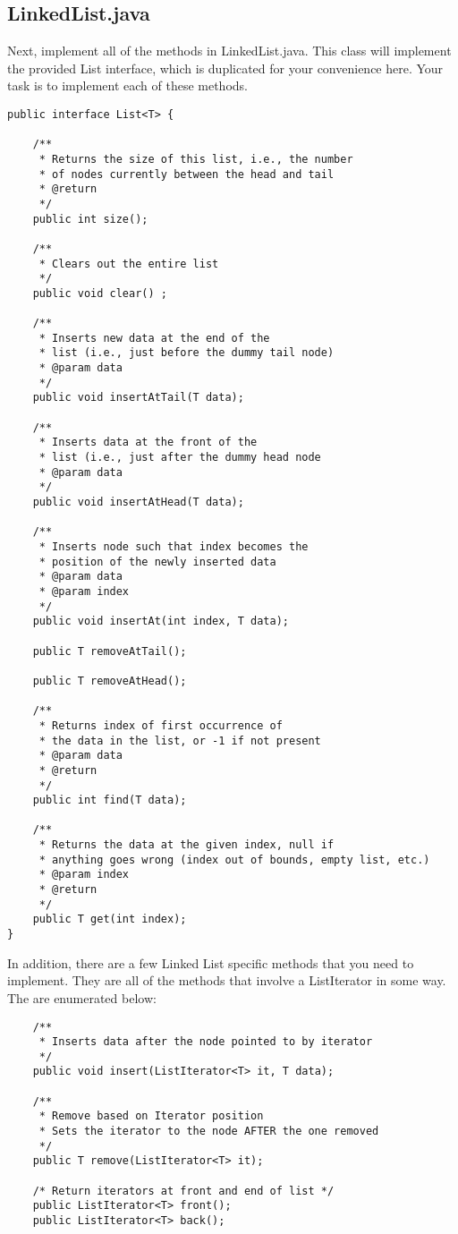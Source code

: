 \documentclass[paper=a4, fontsize=11pt, parskip=full]{scrartcl} %
\numberwithin{equation}{section} %
\numberwithin{figure}{section} %
\numberwithin{table}{section} %
\begin{document}
\subsection{LinkedList.java}

Next, implement all of the methods in LinkedList.java. This class will implement the provided List interface, which is duplicated for your convenience here. Your task is to implement each of these methods.

\begin{lstlisting}
public interface List<T> {

	/**
	 * Returns the size of this list, i.e., the number
	 * of nodes currently between the head and tail
	 * @return
	 */
	public int size();

	/**
	 * Clears out the entire list
	 */
	public void clear() ;

	/**
	 * Inserts new data at the end of the
	 * list (i.e., just before the dummy tail node)
	 * @param data
	 */
	public void insertAtTail(T data);

	/**
	 * Inserts data at the front of the
	 * list (i.e., just after the dummy head node
	 * @param data
	 */
	public void insertAtHead(T data);

	/**
	 * Inserts node such that index becomes the
	 * position of the newly inserted data
	 * @param data
	 * @param index
	 */
	public void insertAt(int index, T data);

	public T removeAtTail();

	public T removeAtHead();

	/**
	 * Returns index of first occurrence of
	 * the data in the list, or -1 if not present
	 * @param data
	 * @return
	 */
	public int find(T data);

	/**
	 * Returns the data at the given index, null if
	 * anything goes wrong (index out of bounds, empty list, etc.)
	 * @param index
	 * @return
	 */
	public T get(int index);
}
\end{lstlisting}

In addition, there are a few Linked List specific methods that you need to implement. They are all of the methods that involve a ListIterator in some way. The are enumerated below:

\begin{lstlisting}
	/**
	 * Inserts data after the node pointed to by iterator
	 */
	public void insert(ListIterator<T> it, T data);

	/**
	 * Remove based on Iterator position
	 * Sets the iterator to the node AFTER the one removed
	 */
	public T remove(ListIterator<T> it);

	/* Return iterators at front and end of list */
	public ListIterator<T> front();
	public ListIterator<T> back();
\end{lstlisting}
\end{document}
